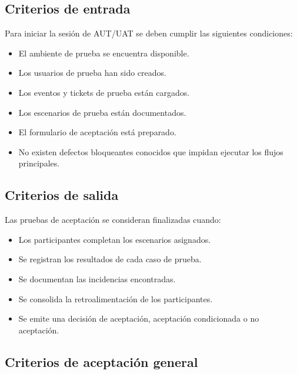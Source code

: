 \documentclass[12pt,letterpaper]{article}
\begin{document}
\subsection{Criterios de entrada}

Para iniciar la sesión de AUT/UAT se deben cumplir las siguientes condiciones:

\begin{itemize}[leftmargin=*]
    \item El ambiente de prueba se encuentra disponible.
    \item Los usuarios de prueba han sido creados.
    \item Los eventos y tickets de prueba están cargados.
    \item Los escenarios de prueba están documentados.
    \item El formulario de aceptación está preparado.
    \item No existen defectos bloqueantes conocidos que impidan ejecutar los flujos principales.
\end{itemize}

\subsection{Criterios de salida}

Las pruebas de aceptación se consideran finalizadas cuando:

\begin{itemize}[leftmargin=*]
    \item Los participantes completan los escenarios asignados.
    \item Se registran los resultados de cada caso de prueba.
    \item Se documentan las incidencias encontradas.
    \item Se consolida la retroalimentación de los participantes.
    \item Se emite una decisión de aceptación, aceptación condicionada o no aceptación.
\end{itemize}

\subsection{Criterios de aceptación general}
\end{document}
